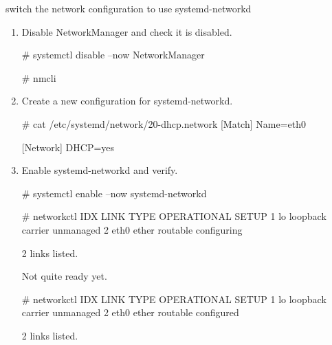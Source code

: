 \begin{Lab}
\begin{exe}{switch the network configuration to use systemd-networkd}
\begin{enumerate}
\begin{raw}
lo: unmanaged
        "lo"
        loopback (unknown), 00:00:00:00:00:00, sw, mtu 65536

DNS configuration:
        servers: 192.168.122.1
        interface: eth0

Use "nmcli device show" to get complete information about known devices and
"nmcli connection show" to get an overview on active connection profiles.
			\end{raw}

	This example is using NetworkManager for the network management.

	\item 
	 Disable NetworkManager and check it is disabled.
		\begin{raw} 
# systemctl disable --now  NetworkManager 

# nmcli 
		\end{raw}
	\item
	Create a new configuration for systemd-networkd.
		\begin{raw}
# cat /etc/systemd/network/20-dhcp.network 
[Match]
Name=eth0

[Network]
DHCP=yes
		\end{raw}

	\item
	Enable systemd-networkd and verify. 
		\begin{raw}
# systemctl enable --now systemd-networkd 
		\end{raw}

		\begin{raw}

# networkctl 
IDX LINK             TYPE               OPERATIONAL SETUP     
  1 lo               loopback           carrier     unmanaged 
  2 eth0             ether              routable    configuring

2 links listed.
		\end{raw}

	Not quite ready yet.
		\begin{raw}
# networkctl 
IDX LINK             TYPE               OPERATIONAL SETUP     
  1 lo               loopback           carrier     unmanaged 
  2 eth0             ether              routable    configured

2 links listed.
		\end{raw}

	\end{enumerate}

\end{exe}
	


\end{Lab}

